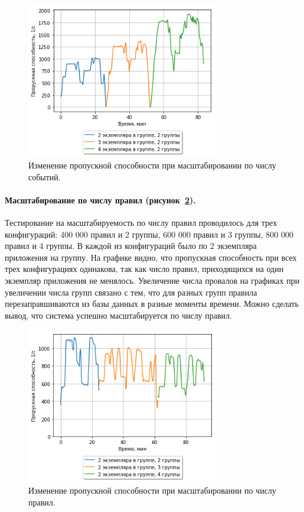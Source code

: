 \documentclass[14pt]{article}
\begin{document}
\begin{figure}[h!]
    \centering
    \includegraphics[width=0.75\textwidth]{images/composite/pointScaling.png}
    \caption{Изменение пропускной способности при масштабировании по числу событий.}
    \label{fig:pointScaling}
\end{figure}

\paragraph{Масштабирование по числу правил (рисунок~\ref{fig:ruleScaling}).} Тестирование на масштабируемость по числу правил проводилось для трех конфигураций: 400 000 правил и 2 группы, 600 000 правил и 3 группы, 800 000 правил и 4 группы. В каждой из конфигураций было по 2 экземпляра приложения на группу. На графике видно, что пропускная способность при всех трех конфигурациях одинакова, так как число правил, приходящихся на один экземпляр приложения не менялось. Увеличение числа провалов на графиках при увеличении числа групп связано с тем, что для разных групп правила перезаправшиваются из базы данных в разные моменты времени. Можно сделать вывод, что система успешно масштабируется по числу правил.
\begin{figure}[h!]
    \centering
    \includegraphics[width=0.75\textwidth]{images/composite/ruleScaling.png}
    \caption{Изменение пропускной способности при масштабировании по числу правил.}
    \label{fig:ruleScaling}
\end{figure}
\end{document}
